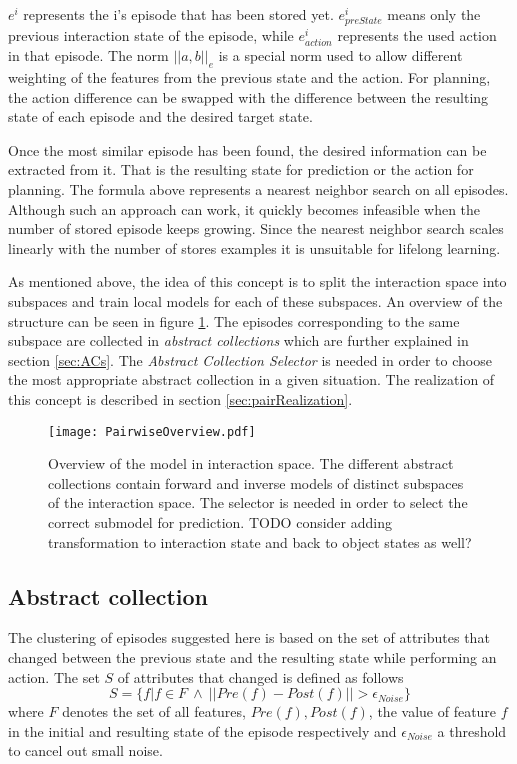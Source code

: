 $e^i$ represents the i's episode that has been stored yet. $e^i_{preState}$ means only the previous interaction state of the episode, while $e^i_{action}$ represents the used action in that episode.
The norm $||a,b||_e$ is a special norm used to allow different weighting of the features from the previous state and the action. For planning, the action difference can be swapped with the difference between the resulting state of each episode and the desired target state.

Once the most similar episode has been found, the desired information can be extracted from it. That is the resulting state for prediction or the action for planning. The formula above represents a nearest neighbor search on all episodes. Although such an approach can work, it quickly becomes infeasible when the number of stored episode keeps growing. Since the nearest neighbor search scales linearly with the number of stores examples it is unsuitable for lifelong learning. 

As mentioned above, the idea of this concept is to split the interaction space into subspaces and train local models for each of these subspaces. An overview of the structure can be seen in figure \ref{fig:PairOverview}.
The episodes corresponding to the same subspace are collected in \textit{abstract collections} which are further explained in section \ref{sec:ACs}.
The \textit{Abstract Collection Selector} is needed in order to choose the most appropriate abstract collection in a given situation. The realization of this concept is described in section \ref{sec:pairRealization}.

\begin{figure}
	\centering
	\texttt{[image: PairwiseOverview.pdf]}
	\caption{Overview of the model in interaction space. The different abstract collections contain forward and inverse models of distinct subspaces of the interaction space. The selector is needed in order to select the correct submodel for prediction. TODO consider adding transformation to interaction state and back to object states as well?} %
	\label{fig:PairOverview}
\end{figure}

\subsection{Abstract collection \label{sec:ACs}}

The clustering of episodes suggested here is based on the set of attributes that changed between the previous state and the resulting state while performing an action. The set $S$ of attributes that changed is defined as follows 
\begin{equation}
S = \{f | f \in F ~ \wedge ~ ||Pre(f)-Post(f)|| > \epsilon_{Noise}\}
\end{equation}
where $F$ denotes the set of all features, $Pre(f), Post(f)$, the value of 
feature $f$ in the initial and resulting state of the episode respectively and 
$\epsilon_{Noise}$ a threshold to cancel out small noise.

